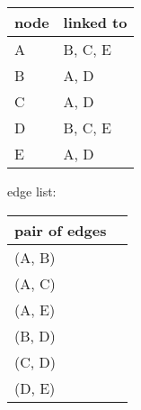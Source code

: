 \begin{enumerate}
	\begin{tabular}{ | m{3cm} | m{3cm} | } 
		\hline
		node & linked to \\ 
		\hline
		A & B, C, E \\ 
		\hline
		B & A, D \\ 
		\hline
		C & A, D \\ 
		\hline
		D & B, C, E \\ 
		\hline
		E & A, D \\ 
		\hline
	\end{tabular}

	edge list:

	\begin{tabular}{ | m{3cm} | m{3cm} | } 
		\hline
		pair of edges \\ 
		\hline
		(A, B) \\ 
		\hline
		(A, C) \\ 
		\hline
		(A, E) \\ 
		\hline
		(B, D) \\ 
		\hline
		(C, D) \\ 
		\hline
		(D, E) \\ 
		\hline
	\end{tabular}
	
\end{enumerate}